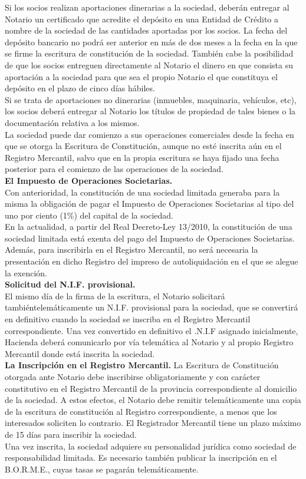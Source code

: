 Si los socios realizan aportaciones dinerarias a la sociedad, deberán entregar al Notario un certificado que acredite el depósito en una Entidad de Crédito a nombre de la sociedad de las cantidades aportadas por los socios. La fecha del depósito bancario no podrá ser anterior en más de dos meses a la fecha en la que se firme la escritura de constitución de la sociedad. También cabe la posibilidad de que los socios entreguen directamente al Notario el dinero en que consista su aportación a la sociedad para que sea el propio Notario el que constituya el depósito en el plazo de cinco días hábiles.\\
Si se trata de aportaciones no dinerarias (inmuebles, maquinaria, vehículos, etc), los socios deberá entregar al Notario los títulos de propiedad de tales bienes o la documentación relativa a los mismos.\\
La sociedad puede dar comienzo a sus operaciones comerciales desde la fecha en que se otorga la Escritura de Constitución, aunque no esté inscrita aún en el Registro Mercantil, salvo que en la propia escritura se haya fijado una fecha posterior para el comienzo de las operaciones de la sociedad.\\
\textbf{El Impuesto de Operaciones Societarias.}\\
Con anterioridad, la constitución de una sociedad limitada generaba para la misma la obligación de pagar el Impuesto de Operaciones Societarias al tipo del uno por ciento (1\%) del capital de la sociedad.\\
En la actualidad, a partir del Real Decreto-Ley 13/2010, la constitución de una sociedad limitada está exenta del pago del Impuesto de Operaciones Societarias. Además, para inscribirla en el Registro Mercantil, no será necesaria la presentación en dicho Registro del impreso de autoliquidación en el que se alegue la exención.\\
\textbf{Solicitud del N.I.F. provisional.}\\
El mismo día de la firma de la escritura, el Notario solicitará tambiéntelemáticamente un N.I.F. provisional para la sociedad, que se convertirá en definitivo cuando la sociedad se inscriba en el Registro Mercantil correspondiente. Una vez convertido en definitivo el .N.I.F asignado inicialmente, Hacienda deberá comunicarlo por vía telemática al Notario y al propio Registro Mercantil donde está inscrita la sociedad.\\
\textbf{La Inscripción en el Registro Mercantil.}
La Escritura de Constitución otorgada ante Notario debe inscribirse obligatoriamente y con carácter constitutivo en el Registro Mercantil de la provincia correspondiente al domicilio de la sociedad. A estos efectos, el Notario debe remitir telemáticamente una copia de la escritura de constitución al Registro correspondiente, a menos que los interesados soliciten lo contrario. El Registrador Mercantil tiene un plazo máximo de 15 días para inscribir la sociedad.\\
Una vez inscrita, la sociedad adquiere su personalidad jurídica como sociedad de responsabilidad limitada.
Es necesario también publicar la inscripción en el B.O.R.M.E., cuyas tasas se pagarán telemáticamente.\\


